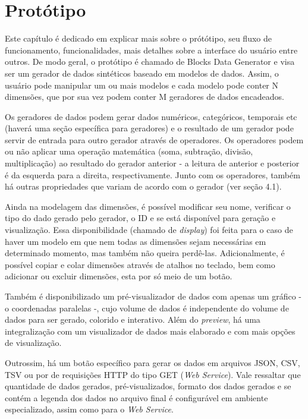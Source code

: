 \documentclass[
	12pt,				%
	openright,			%
	twoside,			%
	a4paper,			%
	english,			%
	brazil				%
	]{abntex2}
\begin{document}
\chapter{Protótipo}
	Este capítulo é dedicado em explicar mais sobre o prótótipo, seu fluxo de funcionamento, funcionalidades, mais detalhes sobre a interface do usuário entre outros.
	De modo geral, o protótipo é chamado de Blocks Data Generator e visa ser um gerador de dados sintéticos baseado em modelos de dados.
	Assim, o usuário pode manipular um ou mais modelos e cada modelo pode conter N dimensões, que por sua vez podem conter M geradores de dados encadeados.
	\par
	Os geradores de dados podem gerar dados numéricos, categóricos, temporais etc (haverá uma seção específica para geradores) e o resultado de um gerador pode servir de entrada para outro gerador através de operadores.
	Os operadores podem ou não aplicar uma operação matemática (soma, subtração, divisão, multiplicação) ao resultado do gerador anterior - a leitura de anterior e posterior é da esquerda para a direita, respectivamente.
	Junto com os operadores, também há outras propriedades que variam de acordo com o gerador (ver seção 4.1).
	\par
	Ainda na modelagem das dimensões, é possível modificar seu nome, verificar o tipo do dado gerado pelo gerador, o ID e se está disponível para geração e visualização.
	Essa disponibilidade (chamado de \emph{display}) foi feita para o caso de haver um modelo em que nem todas as dimensões sejam necessárias em determinado momento, mas também não queira perdê-las.
	Adicionalmente, é possível copiar e colar dimensões através de atalhos no teclado, bem como adicionar ou excluir dimensões, esta por só meio de um botão.
	\par
	Também é disponibilizado um pré-visualizador de dados com apenas um gráfico - o coordenadas paralelas -, cujo volume de dados é independente do volume de dados para ser gerado, colorido e interativo.
	Além do \emph{preview}, há uma integralização com um visualizador de dados mais elaborado e com mais opções de visualização.
	\par
	Outrossim, há um botão específico para gerar os dados em arquivos JSON, CSV, TSV ou por de requisições HTTP do tipo GET (\emph{Web Service}).
	Vale ressaltar que quantidade de dados gerados, pré-visualizados, formato dos dados gerados e se contém a legenda dos dados no arquivo final é configurável em ambiente especializado, assim como para o \emph{Web Service}.
\end{document}
